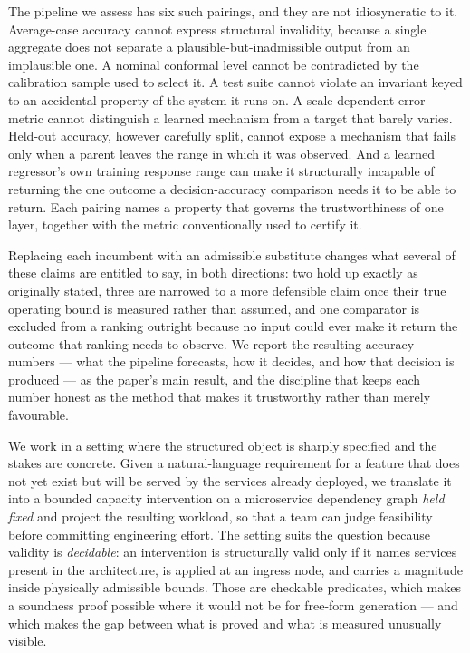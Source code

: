 \documentclass[journal, 10pt]{IEEEtran}
\begin{document}
The pipeline we assess has six such pairings, and they are not idiosyncratic to
it. Average-case accuracy cannot express structural invalidity, because a single
aggregate does not separate a plausible-but-inadmissible output from an
implausible one. A nominal conformal level cannot be contradicted by the
calibration sample used to select it. A test suite cannot violate an invariant
keyed to an accidental property of the system it runs on. A scale-dependent error
metric cannot distinguish a learned mechanism from a target that barely varies.
Held-out accuracy, however carefully split, cannot expose a mechanism that fails
only when a parent leaves the range in which it was observed. And a learned
regressor's own training response range can make it structurally incapable of
returning the one outcome a decision-accuracy comparison needs it to be able to
return. Each pairing names a property that governs the trustworthiness of one
layer, together with the metric conventionally used to certify it.

Replacing each incumbent with an admissible substitute changes what several of
these claims are entitled to say, in both directions: two hold up exactly as
originally stated, three are narrowed to a more defensible claim once their
true operating bound is measured rather than assumed, and one comparator is
excluded from a ranking outright because no input could ever make it return the
outcome that ranking needs to observe. We report the resulting accuracy numbers
--- what the pipeline forecasts, how it decides, and how that decision is
produced --- as the paper's main result, and the discipline that keeps each
number honest as the method that makes it trustworthy rather than merely
favourable.

We work in a setting where the structured object is sharply specified and the
stakes are concrete. Given a natural-language requirement for a feature that does
not yet exist but will be served by the services already deployed, we translate
it into a bounded capacity intervention on a microservice dependency graph
\emph{held fixed} and project the resulting workload, so that a team
can judge feasibility before committing engineering effort. The setting suits the
question because validity is \emph{decidable}: an intervention is structurally
valid only if it names services present in the architecture, is applied at an
ingress node, and carries a magnitude inside physically admissible bounds. Those
are checkable predicates, which makes a soundness proof possible where it would
not be for free-form generation --- and which makes the gap between what is
proved and what is measured unusually visible.
\end{document}
